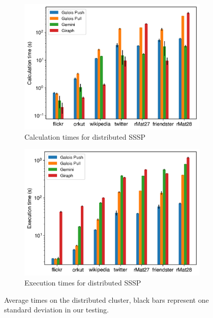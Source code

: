 \begin{figure}
	\centering
	\begin{subfigure}{\columnwidth}
		\includegraphics[width=\linewidth]{../../plots/distributedSSSP_calcTime.png}
		\caption{Calculation times for distributed SSSP}
		\label{fig:distributedSSSP_calc}
	\end{subfigure}
	\begin{subfigure}{\columnwidth}
		\includegraphics[width=\linewidth]{../../plots/distributedSSSP_execTime.png}
		\caption{Execution times for distributed SSSP}
		\label{fig:distributedSSSP_exec}
	\end{subfigure}
	\caption{Average times on the distributed cluster, black bars represent one standard deviation in our testing.}
	\label{fig:distributedSSSP}
\end{figure}

